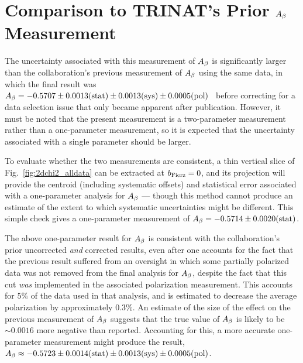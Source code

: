 \section{Comparison to TRINAT's Prior $A_{\beta}$ Measurement}
\label{sec:compare_Abeta}
The uncertainty associated with this measurement of $A_{\beta}$ is significantly larger than the collaboration's previous measurement of $A_{\beta}$ using the same data, in which the final result was $\mbox{$A_{\beta} = -0.5707 \pm 0.0013(\textrm{stat}) \pm 0.0013(\textrm{sys}) \pm 0.0005(\textrm{pol})$}$~\cite{ben_Abeta} before correcting for a data selection issue that only became apparent after publication.  However, it must be noted that the present measurement is a two-parameter measurement rather than a one-parameter measurement, so it is expected that the uncertainty associated with a single parameter should be larger.

To evaluate whether the two measurements are consistent, a thin vertical slice of Fig.~\ref{fig:2dchi2_alldata} can be extracted at $b_{\mathrm{Fierz}}=0$, and its projection will provide the centroid (including systematic offsets) and statistical error associated with a one-parameter analysis for $A_{\beta}$ --- though this method cannot produce an estimate of the extent to which systematic uncertainties might be different.  This simple check gives a one-parameter measurement of $A_{\beta} = -0.5714 \pm 0.0020(\textrm{stat})$.

The above one-parameter result for $A_{\beta}$ is consistent with the collaboration's prior uncorrected \emph{and} corrected results, even after one accounts for the fact that the previous result suffered from an oversight in which some partially polarized data was not removed from the final analysis for $A_{\beta}$, despite the fact that this cut \emph{was} implemented in the associated polarization measurement.  This accounts for $5\%$ of the data used in that analysis, and is estimated to decrease the average polarization by approximately $0.3\%$.  
An estimate of the size of the effect on the previous measurement of $A_{\beta}$ suggests that the true value of $A_{\beta}$ is likely to be $\sim 0.0016$ more negative than reported.  
Accounting for this, a more accurate one-parameter measurement might produce the result, $\mbox{$A_{\beta} \approx -0.5723 \pm 0.0014(\textrm{stat}) \pm 0.0013(\textrm{sys}) \pm 0.0005(\textrm{pol})$}$.



